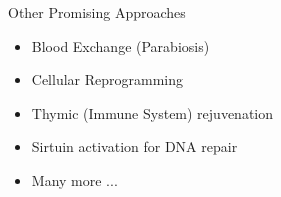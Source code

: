 \begin{frame}[c]{Other Promising Approaches}
    \large
    \begin{itemize}[<+(1)->]
        \item Blood Exchange (Parabiosis) \cite{conese2017fountain}
        \item Cellular Reprogramming \cite{ocampo2016vivo}
        \item Thymic (Immune System) rejuvenation \cite{fahy2019reversal}
        \item Sirtuin activation for DNA repair \cite{mohar2012sirtuin}
        \item Many more ...
    \end{itemize}
\end{frame}


